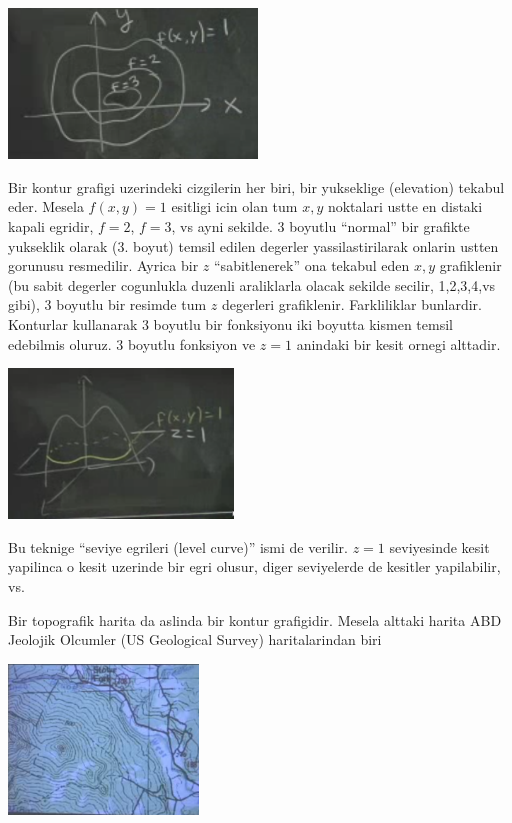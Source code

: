 \documentclass[12pt,fleqn]{article}
\begin{document}
\includegraphics[height=4cm]{8_7.png}

Bir kontur grafigi uzerindeki cizgilerin her biri, bir yukseklige
(elevation) tekabul eder. Mesela $f(x,y)=1$ esitligi icin olan tum $x,y$
noktalari ustte en distaki kapali egridir, $f=2$, $f=3$, vs ayni sekilde. 3
boyutlu ``normal'' bir grafikte yukseklik olarak (3. boyut) temsil edilen
degerler yassilastirilarak onlarin ustten gorunusu resmedilir. Ayrica bir
$z$ ``sabitlenerek'' ona tekabul eden $x,y$ grafiklenir (bu sabit degerler
cogunlukla duzenli araliklarla olacak sekilde secilir, 1,2,3,4,vs gibi), 3
boyutlu bir resimde tum $z$ degerleri grafiklenir. Farkliliklar
bunlardir. Konturlar kullanarak 3 boyutlu bir fonksiyonu iki boyutta kismen
temsil edebilmis oluruz. 3 boyutlu fonksiyon ve $z=1$ anindaki bir kesit
ornegi alttadir. 

\includegraphics[height=4cm]{8_8.png}

Bu teknige ``seviye egrileri (level curve)'' ismi de verilir. $z=1$
seviyesinde kesit yapilinca o kesit uzerinde bir egri olusur, diger
seviyelerde de kesitler yapilabilir, vs. 

Bir topografik harita da aslinda bir kontur grafigidir. Mesela alttaki
harita ABD Jeolojik Olcumler (US Geological Survey) haritalarindan biri

\includegraphics[height=4cm]{8_9.png}
\end{document}
